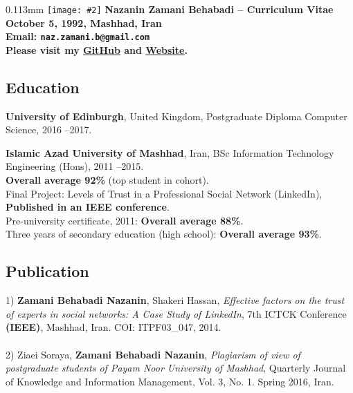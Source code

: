 \documentclass[10pt]{article}
\newcommand{\imagetext}[3][0.11]{%
\begin{imagetextbox}[]{#1\textwidth}{3mm}%
  \texttt{[image: \#2]}%
  \tcblower%
   #3%
\end{imagetextbox}}
\begin{document}
\imagetext{1.jpg}{\Large\bf Nazanin Zamani Behabadi -- \textcolor{ green!50!red}{Curriculum Vitae} \\ \normalsize October 5, 1992, Mashhad, Iran \\ \normalsize Email: \texttt{naz.zamani.b@gmail.com}\\ \small{Please visit my \href{https://github.com/Nazzamani}{\underline{GitHub}} and \href{https://nazzamani.github.io}{\underline{Website}}.}}
\thispagestyle{empty}

\subsection*{Education}
\noindent \textbf{University of Edinburgh}, United Kingdom, Postgraduate Diploma Computer Science, 2016 --2017.

\noindent \textbf{Islamic Azad University of Mashhad}, Iran, BSc Information Technology Engineering (Hons), 2011 --2015. \\
\indent \textbf{Overall average 92\%} (top student in cohort).\\
\indent Final Project: Levels of Trust in a Professional Social Network (LinkedIn), \textbf {Published in an IEEE conference}.\\
\noindent Pre-university certificate, 2011: \textbf{Overall average  88\%}. \\
\noindent Three years of secondary education (high school): \textbf{Overall average  93\%}.
\subsection*{Publication}

 1)\textbf{ Zamani Behabadi Nazanin}, Shakeri Hassan, \textit{Effective factors on the trust of experts in social networks: A Case Study of LinkedIn}, 7th ICTCK Conference\textbf{ (IEEE)}, Mashhad, Iran. COI:  ITPF03\_047, 2014.\\\\
2) Ziaei Soraya, \textbf{Zamani Behabadi Nazanin}, \textit{Plagiarism of view of postgraduate students of Payam Noor University of Mashhad}, Quarterly Journal of Knowledge and Information Management, Vol. 3, No. 1. Spring 2016, Iran.
\end{document}
